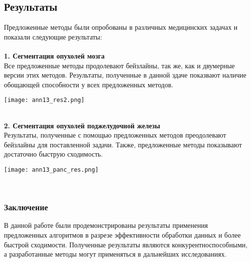 \subsection*{Результаты}
 Предложенные методы были опробованы в различных медицинских задачах и показали 
 следующие результаты: \\  \\
 \textbf{1. Сегментация опухолей мозга} \\
Все предложенные методы продолевают бейзлайны, так же, как и двумерные версии этих методов.
Результаты, полученные в данной здаче показвают наличие обощающей способности
у всех предложенных методов. \\
 \begin{minipage}{1.0\linewidth}
    \begin{center}
        \texttt{[image: ann13\_res2.png]} \\
    \end{center}
\end{minipage} \\
\textbf{2. Сегментация опухолей поджелудочной железы} \\
Результаты, полученные с помощью предложенных методов преодолевают бейзлайны для поставленной 
задачи. Также, предложенные методы показывают достаточно быструю сходимость.

\begin{minipage}{1.0\linewidth}
    \begin{center}
        \texttt{[image: ann13\_panc\_res.png]} \\
    \end{center}
\end{minipage} \\
\subsubsection*{Заключение}
В данной работе были продемонстрированы результаты применения предложенных 
алгоритмов в разрезе эффективности обработки данных и более быстрой сходимости.
Полученные результаты являются конкурентноспособными, а разработанные 
методы могут применяться в дальнейших исследованиях.